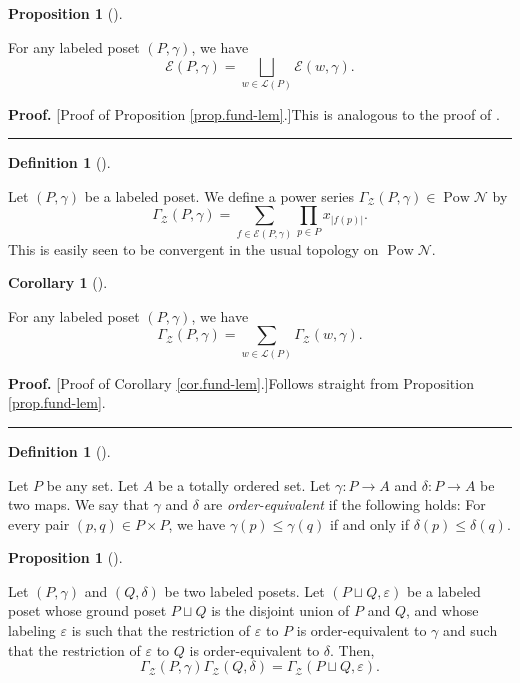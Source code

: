 \documentclass[numbers=enddot,12pt,final,onecolumn,notitlepage]{scrartcl}%
\theoremstyle{definition}
\newtheorem{prop}[theo]{Proposition}
\newenvironment{proposition}[1][]
{\begin{prop}[#1]\begin{leftbar}}
{\end{leftbar}\end{prop}}
\newtheorem{defi}[theo]{Definition}
\newenvironment{definition}[1][]
{\begin{defi}[#1]\begin{leftbar}}
{\end{leftbar}\end{defi}}
\newtheorem{coro}[theo]{Corollary}
\newenvironment{corollary}[1][]
{\begin{coro}[#1]\begin{leftbar}}
{\end{leftbar}\end{coro}}
\newenvironment{proof}[1][Proof]{\noindent\textbf{#1.} }{\ \rule{0.5em}{0.5em}}
\let\sumnonlimits\sum
\let\prodnonlimits\prod
\renewcommand{\sum}{\sumnonlimits\limits}
\renewcommand{\prod}{\prodnonlimits\limits}
\begin{document}
\begin{proposition}
\label{prop.fund-lem}For any labeled poset $\left(  P,\gamma\right)  $, we
have%
\[
\mathcal{E}\left(  P,\gamma\right)  =\bigsqcup_{w\in\mathcal{L}\left(
P\right)  }\mathcal{E}\left(  w,\gamma\right)  .
\]

\end{proposition}

\begin{proof}
[Proof of Proposition \ref{prop.fund-lem}.]This is analogous to the proof of
\cite[Lemma 2.1]{Stembr97}.
\end{proof}

\begin{definition}
\label{def.GammaZ}Let $\left(  P,\gamma\right)  $ be a labeled poset. We
define a power series $\Gamma_{\mathcal{Z}}\left(  P,\gamma\right)
\in\operatorname*{Pow}\mathcal{N}$ by%
\[
\Gamma_{\mathcal{Z}}\left(  P,\gamma\right)  =\sum_{f\in\mathcal{E}\left(
P,\gamma\right)  }\prod_{p\in P}x_{\left\vert f\left(  p\right)  \right\vert
}.
\]
This is easily seen to be convergent in the usual topology on
$\operatorname*{Pow}\mathcal{N}$.
\end{definition}

\begin{corollary}
\label{cor.fund-lem}For any labeled poset $\left(  P,\gamma\right)  $, we have%
\[
\Gamma_{\mathcal{Z}}\left(  P,\gamma\right)  =\sum_{w\in\mathcal{L}\left(
P\right)  }\Gamma_{\mathcal{Z}}\left(  w,\gamma\right)  .
\]

\end{corollary}

\begin{proof}
[Proof of Corollary \ref{cor.fund-lem}.]Follows straight from Proposition
\ref{prop.fund-lem}.
\end{proof}

\begin{definition}
Let $P$ be any set. Let $A$ be a totally ordered set. Let $\gamma:P\rightarrow
A$ and $\delta:P\rightarrow A$ be two maps. We say that $\gamma$ and $\delta$
are \textit{order-equivalent} if the following holds: For every pair $\left(
p,q\right)  \in P\times P$, we have $\gamma\left(  p\right)  \leq\gamma\left(
q\right)  $ if and only if $\delta\left(  p\right)  \leq\delta\left(
q\right)  $.
\end{definition}

\begin{proposition}
\label{prop.prod1}Let $\left(  P,\gamma\right)  $ and $\left(  Q,\delta
\right)  $ be two labeled posets. Let $\left(  P\sqcup Q,\varepsilon\right)  $
be a labeled poset whose ground poset $P\sqcup Q$ is the disjoint union of $P$
and $Q$, and whose labeling $\varepsilon$ is such that the restriction of
$\varepsilon$ to $P$ is order-equivalent to $\gamma$ and such that the
restriction of $\varepsilon$ to $Q$ is order-equivalent to $\delta$. Then,%
\[
\Gamma_{\mathcal{Z}}\left(  P,\gamma\right)  \Gamma_{\mathcal{Z}}\left(
Q,\delta\right)  =\Gamma_{\mathcal{Z}}\left(  P\sqcup Q,\varepsilon\right)  .
\]

\end{proposition}
\end{document}
